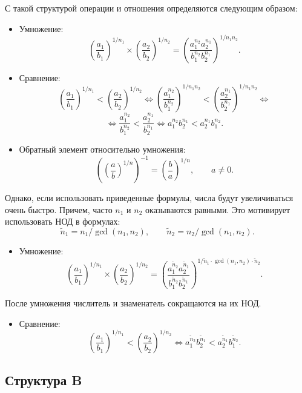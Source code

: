 \documentclass[specialist,
substylefile = spbu.rtx,
               subf,href,colorlinks=true, 12pt]{disser}
\begin{document}
    С такой структурой операции и отношения определяются следующим образом:
    \begin{itemize}
        \item Умножение:
        $$ \left(\frac{a_1}{b_1}\right)^{1/n_1} \times \left(\frac{a_2}{b_2}\right)^{1/n_2} = \left(\frac{a_1^{n_2}a_2^{n_1}}{b_1^{n_2}b_2^{n_1}}\right)^{1/n_1n_2}.$$
        \item Сравнение:
        $$ \left(\frac{a_1}{b_1}\right)^{1/n_1} < \left(\frac{a_2}{b_2}\right)^{1/n_2} \Leftrightarrow
        \left(\frac{a_1^{n_2}}{b_1^{n_2}}\right)^{1/n_1n_2} < \left(\frac{a_2^{n_1}}{b_2^{n_1}}\right)^{1/n_1n_2}\Leftrightarrow$$
        $$\Leftrightarrow
        \frac{a_1^{n_2}}{b_1^{n_2}} < \frac{a_2^{n_1}}{b_2^{n_1}}\Leftrightarrow
        {a_1^{n_2}}{b_2^{n_1}} < {a_2^{n_1}}{b_1^{n_2}}.$$
        \item Обратный элемент относительно умножения:
        $$ \left(\left(\frac{a}{b}\right)^{1/n}\right)^{-1} = \left(\frac{b}{a}\right)^{1/n}, \qquad a \neq 0.$$
    \end{itemize}

    Однако, если использовать приведенные формулы, числа будут увеличиваться очень быстро.
    Причем, часто $n_1$ и $n_2$ оказываются равными. Это мотивирует использовать НОД в формулах:
    $$\tilde{n}_1 = n_1 / \gcd(n_1, n_2), \qquad \tilde{n}_2 = n_2 / \gcd(n_1, n_2).$$

    \begin{itemize}
        \item Умножение:
        $$ \left(\frac{a_1}{b_1}\right)^{1/n_1} \times \left(\frac{a_2}{b_2}\right)^{1/n_2} = \left(\frac{a_1^{\tilde{n}_2}a_2^{\tilde{n}_1}}{b_1^{\tilde{n}_2}b_2^{\tilde{n}_1}}\right)^{1/\tilde{n}_1\cdot \gcd(n_1, n_2) \cdot \tilde{n}_2}.$$
    \end{itemize}
        После умножения числитель и знаменатель сокращаются на их НОД.
    \begin{itemize}
        \item Сравнение:
        $$ \left(\frac{a_1}{b_1}\right)^{1/n_1} < \left(\frac{a_2}{b_2}\right)^{1/n_2} \Leftrightarrow
        {a_1^{\tilde{n}_2}}{b_2^{\tilde{n}_1}} < {a_2^{\tilde{n}_1}}{b_1^{\tilde{n}_2}}.$$
    \end{itemize}

    \subsection{Структура B}
\end{document}
